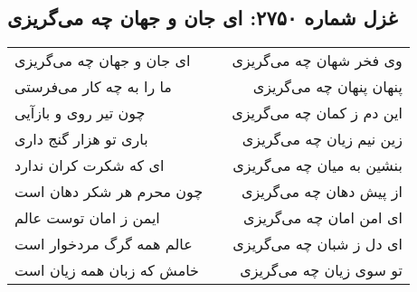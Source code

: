 \begin{center}
\section*{غزل شماره ۲۷۵۰: ای جان و جهان چه می‌گریزی}
\label{sec:2750}
\begin{longtable}{l p{0.5cm} r}
ای جان و جهان چه می‌گریزی
&&
وی فخر شهان چه می‌گریزی
\\
ما را به چه کار می‌فرستی
&&
پنهان پنهان چه می‌گریزی
\\
چون تیر روی و بازآیی
&&
این دم ز کمان چه می‌گریزی
\\
باری تو هزار گنج داری
&&
زین نیم زیان چه می‌گریزی
\\
ای که شکرت کران ندارد
&&
بنشین به میان چه می‌گریزی
\\
چون محرم هر شکر دهان است
&&
از پیش دهان چه می‌گریزی
\\
ایمن ز امان توست عالم
&&
ای امن امان چه می‌گریزی
\\
عالم همه گرگ مردخوار است
&&
ای دل ز شبان چه می‌گریزی
\\
خامش که زبان همه زیان است
&&
تو سوی زیان چه می‌گریزی
\\
\end{longtable}
\end{center}
